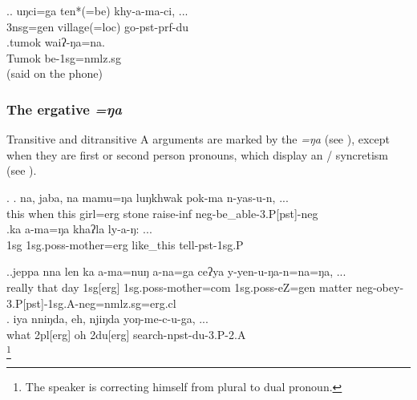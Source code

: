 	\ex.\ag. uŋci=ga    ten*(=be)        khy-a-ma-ci, ...\\
	{\sc 3nsg=gen} village{\sc *(=loc)}  go{\sc -pst-prf-du}		\\
	 	
	\bg.tumok waiʔ-ŋa=na.\\
Tumok{\sc [loc]} be{\sc [npst]-1sg=nmlz.sg}\\
 (said on the phone)	
		
\subsubsection{The ergative \emph{=ŋa}}\label{case-erg}

Transitive and ditransitive A arguments are marked by the  \emph{=ŋa} (see \Next), except when they are first or second person pronouns, which display an / syncretism (see \NNext). 

	\ex. \ag. na,   jaba,   na   mamu=ŋa   luŋkhwak pok-ma        n-yas-u-n, ... \\
	this when this girl{\sc =erg} stone raise{\sc -inf}  {\sc neg-}be\_able{\sc -3.P[pst]-neg}\\
	\bg.ka  a-ma=ŋa                khaʔla   ly-a-ŋ: ...\\
	{\sc  1sg} {\sc 1sg.poss-}mother{\sc =erg} like\_this tell{\sc [3sg.A]-pst-1sg.P}\\

	
	\ex.\ag.jeppa nna  len ka       a-ma=nuŋ                a-na=ga     ceʔya y-yen-u-ŋa-n=na=ŋa, ...\\
	really that day {\sc 1sg[erg]} {\sc 1sg.poss-}mother{\sc =com} {\sc 1sg.poss-}eZ{\sc =gen} matter {\sc neg-}obey{\sc -3.P[pst]-1sg.A-neg=nmlz.sg=erg.cl}\\ 
\bg. iya nniŋda, eh,    njiŋda  yoŋ-me-c-u-ga, ...\\
what {\sc 2pl[erg]} oh {\sc 2du[erg]} search{\sc -npst-du-3.P-2.A}\\
\footnote{The speaker is correcting himself from plural to dual pronoun.} 
	
